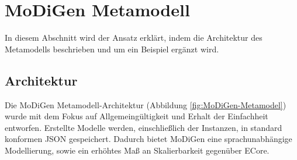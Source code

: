\section{MoDiGen Metamodell}
In diesem Abschnitt wird der Ansatz erkl\"art, indem die Architektur des Metamodells beschrieben und um ein Beispiel erg\"anzt wird.

\subsection{Architektur}
Die MoDiGen Metamodell-Architektur (Abbildung \ref{fig:MoDiGen-Metamodel}) wurde mit dem Fokus auf Allgemeingültigkeit und Erhalt der Einfachheit entworfen. Erstellte Modelle werden, einschließlich der Instanzen, in standard konformen JSON gespeichert. Dadurch bietet MoDiGen eine sprachunabhängige Modellierung, sowie ein erhöhtes Maß an Skalierbarkeit gegenüber ECore.



